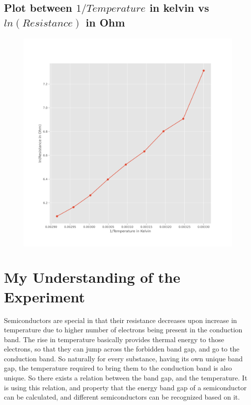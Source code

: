 \documentclass[12pt]{article}
\begin{document}
\subsection{Plot between $1/Temperature$ in kelvin vs $ln(Resistance)$ in Ohm}
\begin{figure}[H]
	\centering
	\includegraphics[scale=0.55]{fig2.png}
	\label{it}
\end{figure}

\section{My Understanding of the Experiment}
Semiconductors are special in that their resistance decreases upon increase in temperature due to higher number of electrons being present in the conduction band. 
The rise in temperature basically provides thermal energy to those electrons, so that they can jump across the forbidden band gap, and go to the conduction band. So naturally
for every substance, having its own unique band gap, the temperature required to bring them to the conduction band is also unique. So there exists a relation between the 
band gap, and the temperature. It is using this relation, and property that the energy band gap of a semiconductor can be calculated, and different semiconductors can be recognized based
on it. 
\end{document}
